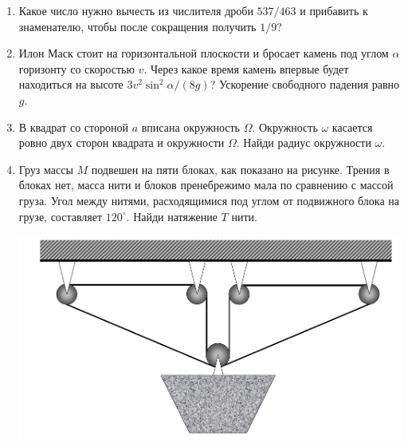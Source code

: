 \documentclass[12pt]{article} %
\begin{document}
\begin{enumerate}
\item Какое число нужно вычесть из числителя дроби $537/463$ и прибавить к знаменателю, 
чтобы после сокращения получить $1/9$?

\item
Илон Маск стоит на горизонтальной плоскости и бросает камень под углом $\alpha$  горизонту со скоростью $v$. 
Через какое время камень впервые будет находиться на высоте $3 v^2 \sin^2 \alpha / (8 g)$? 
Ускорение свободного падения равно $g$. 

\item
В квадрат со стороной $a$ вписана окружность $\Omega$. 
Окружность $\omega$ касается ровно двух сторон квадрата и окружности $\Omega$. Найди радиус окружности $\omega$.

\item
\begin{minipage}{\linewidth}
        \centering
        \begin{minipage}{0.60\linewidth}
        Груз массы $M$ подвешен на пяти блоках, как показано на рисунке. 
        Трения в блоках нет, масса нити и блоков пренебрежимо мала по сравнению с массой груза. 
        Угол между нитями, расходящимися под углом от подвижного блока на грузе, составляет $120^{\circ}$. 
        Найди натяжение $T$ нити.
        \end{minipage}
        \hspace{0.05\linewidth}
        \begin{minipage}{0.3\linewidth}
            \includegraphics[scale=0.2]{fig2_tmp.pdf}
        \end{minipage}
    \end{minipage}


\end{enumerate}
    
\end{document}
